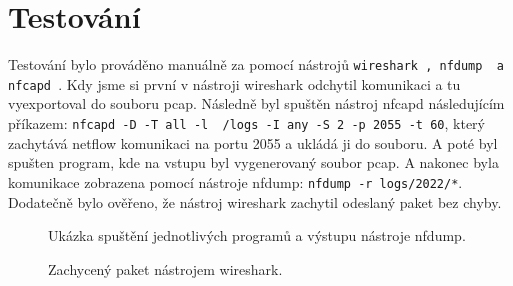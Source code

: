 \documentclass[12pt]{article}
\begin{document}
\section{Testování}
Testování bylo prováděno manuálně za pomocí nástrojů \texttt{wireshark \cite{wire}, nfdump \cite{DUMP} a\\ nfcapd \cite{CAPD}}. Kdy jsme si první v nástroji wireshark odchytil komunikaci a tu vyexportoval do souboru
pcap. Následně byl spuštěn nástroj nfcapd následujícím příkazem: \texttt{nfcapd -D -T all -l ~/logs -I any -S 2 -p 2055 -t 60}, který zachytává netflow komunikaci na portu 2055 a ukládá ji do souboru.
A poté byl spušten program, kde na vstupu byl vygenerovaný soubor pcap. A nakonec byla komunikace zobrazena pomocí nástroje nfdump: \texttt{nfdump -r logs/2022/*}. Dodatečně bylo ověřeno, že nástroj wireshark zachytil odeslaný paket bez chyby.
\begin{figure}[H]
	\begin{center}
	\caption{Ukázka spuštění jednotlivých programů a výstupu nástroje nfdump.}
	\label{fig:picture1}
	\end{center}
\end{figure}
\begin{figure}[H]
	\begin{center}
	\caption{Zachycený paket nástrojem wireshark.}
	\label{fig:picture2}
	\end{center}
\end{figure}
\end{document}
